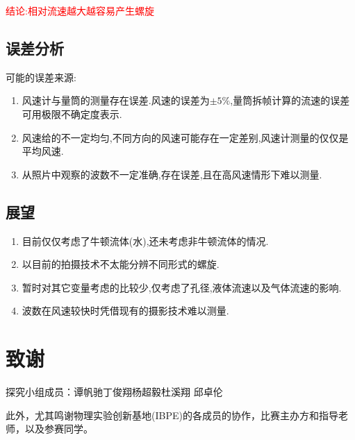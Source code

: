 \documentclass[UTF8]{gapd}
\begin{document}
\textcolor{red}{结论:相对流速越大越容易产生螺旋}
\subsection{误差分析}

可能的误差来源:
\begin{enumerate}
	\item 风速计与量筒的测量存在误差.风速的误差为$	\pm 5\%	$,量筒拆帧计算的流速的误差可用极限不确定度表示.
	\item 风速给的不一定均匀,不同方向的风速可能存在一定差别,风速计测量的仅仅是平均风速.
	\item 从照片中观察的波数不一定准确,存在误差,且在高风速情形下难以测量.
\end{enumerate}

\subsection{展望}
\begin{enumerate}
	\item 目前仅仅考虑了牛顿流体(水),还未考虑非牛顿流体的情况.
	\item 以目前的拍摄技术不太能分辨不同形式的螺旋.
	\item 暂时对其它变量考虑的比较少,仅考虑了孔径,液体流速以及气体流速的影响.
	\item 波数在风速较快时凭借现有的摄影技术难以测量.
\end{enumerate}      
\section*{致谢}
探究小组成员：谭帆驰\quad  丁俊翔\quad  杨超毅\quad  杜溪翔 \quad 邱卓伦  

此外，尤其鸣谢物理实验创新基地(IBPE)的各成员的协作，比赛主办方和指导老师，以及参赛同学。


\end{document}
